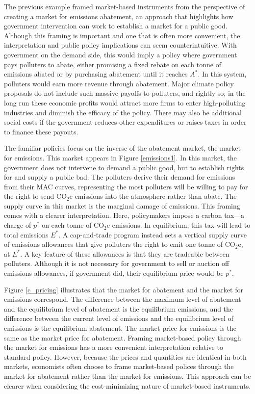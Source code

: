 The previous example framed market-based instruments from the perspective of creating a market for emissions abatement, an approach that highlights how government intervention can work to establish a market for a public good. Although this framing is important and one that is often more convenient, the interpretation and public policy implications can seem counterintuitive. With government on the demand side, this would imply a policy where government pays polluters to abate, either promising a fixed rebate on each tonne of emissions abated or by purchasing abatement until it reaches $A^*$. In this system, polluters would earn more revenue through abatement. Major climate policy proposals do not include such massive payoffs to polluters, and rightly so; in the long run these economic profits would attract more firms to enter high-polluting industries and diminish the efficacy of the policy. There may also be additional social costs if the government reduces other expenditures or raises taxes in order to finance these payouts. 

The familiar policies focus on the inverse of the abatement market, the market for emissions. This market appears in Figure \ref{emissions1}. In this market, the government does not intervene to demand a public good, but to establish rights for and supply a public bad. The polluters derive their demand for emissions from their MAC curves, representing the most polluters will be willing to pay for the right to send CO$_2$e emissions into the atmosphere rather than abate. The supply curve in this market is the marginal damage of emissions. This framing comes with a clearer interpretation. Here, policymakers impose a carbon tax---a charge of $p^*$ on each tonne of CO$_2$e emissions. In equilibrium, this tax will lead to total emissions $E^*$. A cap-and-trade program instead sets a vertical supply curve of emissions allowances that give polluters the right to emit one tonne of CO$_2$e, at $E^*$. A key feature of these allowances is that they are tradeable between polluters. Although it is not necessary for government to sell or auction off emissions allowances, if government did, their equilibrium price would be $p^*$. 

Figure \ref{c_pricing} illustrates that the market for abatement and the market for emissions correspond. The difference between the maximum level of abatement and the equilibrium level of abatement is the equilibrium emissions, and the difference between the current level of emissions and the equilibrium level of emissions is the equilibrium abatement. The market price for emissions is the same as the market price for abatement. Framing market-based policy through the market for emissions has a more convenient interpretation relative to standard policy. However, because the prices and quantities are identical in both markets, economists often choose to frame market-based polices through the market for abatement rather than the market for emissions. This approach can be clearer when considering the cost-minimizing nature of market-based instruments.


